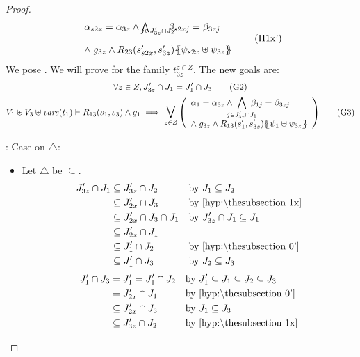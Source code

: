 \documentclass{article}
\begin{document}
\begin{proof}
\begin{gather*}
{\begin{array}{l}
		\alpha_{s2x} = \alpha_{3z} \wedge \bigwedge_\subbox{j \in J'_{3z} \cap J_2} \beta_{s2xj} = \beta_{3zj} \\[12pt]
		\nwedge g_{3z} \wedge R_{23}\mpar{s'_{s2x}, s'_{3z}}\psubst{\psi_{s2x} \uplus \psi_{3z}}
	\end{array}\!} \hyp{1x'}
\end{gather*}
We pose .
We will prove  for the family \(t_{3z}^{z \in Z}\).
The new goals are:
\begin{gather}
	\forall z \in Z, J'_{3z} \cap J_1 = J'_1 \cap J_3 \goal{2} \\
	V_1 \uplus V_3 \uplus \fvars{t_1} \vdash R_{13}\mpar{s_1, s_3} \wedge g_1 \implies \operatorname*{\bigsymb{\bigvee}}_{z \in Z} \mpar{\everymath{\displaystyle}\begin{array}{l}
		\alpha_1 = \alpha_{3z} \wedge \bigwedge_\subbox{j \in J'_{3z} \cap J_1} \beta_{1j} = \beta_{3zj} \\[12pt]
		\nwedge g_{3z} \wedge R_{13}\mpar{s'_1, s'_{3z}}\psubst{\psi_1 \uplus \psi_{3z}}
	\end{array}} \goal{3}
\end{gather}
\item[\goal{2}:] Case on \(\triangle\):
\begin{itemize}
\item Let \(\triangle\) be \(\subseteq\).
	\begin{align*}
	J'_{3z} \cap J_1 & \subseteq J'_{3z} \cap J_2 & \text{by } & J_1 \subseteq J_2 \\
		& \subseteq J'_{2x} \cap J_3 & \text{by } & \text{\hyp{1x}} \\
		& \subseteq J'_{2x} \cap J_3 \cap J_1 & \text{by } & J'_{3z} \cap J_1 \subseteq J_1 \\
		& \subseteq J'_{2x} \cap J_1 && \\
		& \subseteq J'_1 \cap J_2 & \text{by } & \text{\hyp{0'}} \\
		& \subseteq J'_1 \cap J_3 & \text{by } & J_2 \subseteq J_3
	\end{align*}
	\begin{align*}
	J'_1 \cap J_3 & = J'_1 = J'_1 \cap J_2 & \text{by } & J'_1 \subseteq J_1 \subseteq J_2 \subseteq J_3 \\
		& = J'_{2x} \cap J_1 & \text{by } & \text{\hyp{0'}} \\
		& \subseteq J'_{2x} \cap J_3 & \text{by } & J_1 \subseteq J_3 \\
		& \subseteq J'_{3z} \cap J_2 & \text{by } & \text{\hyp{1x}} \\

\end{align*}
\end{itemize}
\end{proof}
\end{document}
